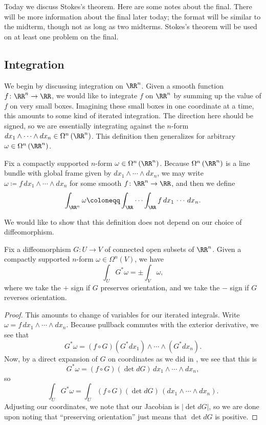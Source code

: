 \documentclass[../notes.tex]{subfiles}
\begin{document}
Today we discuss Stokes's theorem. Here are some notes about the final. There will be more information about the final later today; the format will be similar to the midterm, though not as long as two midterms. Stokes's theorem will be used on at least one problem on the final.

\subsection{Integration}
We begin by discussing integration on $\RR^n$. Given a smooth function $f\colon\RR^n\to\RR$, we would like to integrate $f$ on $\RR^n$ by summing up the value of $f$ on very small boxes. Imagining these small boxes in one coordinate at a time, this amounts to some kind of iterated integration. The direction here should be signed, so we are essentially integrating against the $n$-form $dx_1\land\cdots\land dx_n\in\Omega^n\left(\RR^n\right)$. This definition then generalizes for arbitrary $\omega\in\Omega^n\left(\RR^n\right)$.
\begin{definition}
	Fix a compactly supported $n$-form $\omega\in\Omega^n\left(\RR^n\right)$. Because $\Omega^n\left(\RR^n\right)$ is a line bundle with global frame given by $dx_1\land\cdots\land dx_n$, we may write $\omega\coloneqq f\,dx_1\land\cdots\land dx_n$ for some smooth $f\colon\RR^n\to\RR$, and then we define
	\[\int_{\RR^n}\omega\coloneqq\int_\RR\cdots\int_\RR f\,dx_1\,\cdots\,dx_n.\]
\end{definition}
We would like to show that this definition does not depend on our choice of diffeomorphism.
\begin{proposition}
	Fix a diffeomorphism $G\colon U\to V$ of connected open subsets of $\RR^n$. Given a compactly supported $n$-form $\omega\in\Omega^n(V)$, we have
	\[\int_UG^*\omega=\pm\int_V\omega,\]
	where we take the $+$ sign if $G$ preserves orientation, and we take the $-$ sign if $G$ reverses orientation.
\end{proposition}
\begin{proof}
	This amounts to change of variables for our iterated integrals. Write $\omega=f\,dx_1\land\cdots\land dx_n$. Because pullback commutes with the exterior derivative, we see that
	\[G^*\omega=(f\circ G)(G^*dx_1)\land\cdots\land(G^*dx_n).\]
	Now, by a direct expansion of $G$ on coordinates as we did in , we see that this is
	\[G^*\omega=(f\circ G)(\det dG)\,dx_1\land\cdots\land dx_n,\]
	so
	\[\int_UG^*\omega=\int_U(f\circ G)(\det dG)\,(dx_1\land\cdots\land dx_n).\]
	Adjusting our coordinates, we note that our Jacobian is $\left|\det dG\right|$, so we are done upon noting that ``preserving orientation'' just means that $\det dG$ is positive.
\end{proof}
\end{document}
